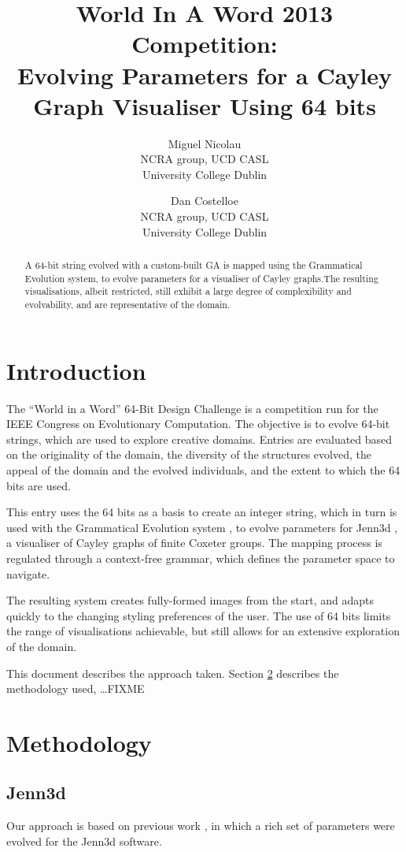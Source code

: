 \documentclass{article}
\title{World In A Word 2013 Competition:\\
Evolving Parameters for a Cayley Graph Visualiser Using 64 bits}
\author{Miguel Nicolau\\
NCRA group, UCD CASL\\
University College Dublin
\and Dan Costelloe\\
NCRA group, UCD CASL\\
University College Dublin}
\date{}
\begin{document}
\maketitle
\begin{abstract}
A 64-bit string evolved with a custom-built GA is mapped using the Grammatical
Evolution system, to evolve parameters for a visualiser of Cayley graphs.The
resulting visualisations, albeit restricted, still exhibit a large degree of
complexibility and evolvability, and are representative of the domain.
\end{abstract}

\section{Introduction}
The ``World in a Word'' 64-Bit Design Challenge is a competition run for the
IEEE Congress on Evolutionary Computation. The objective is to evolve 64-bit
strings, which are used to explore creative domains. Entries are evaluated
based on the originality of the domain, the diversity of the structures
evolved, the appeal of the domain and the evolved individuals, and the extent
to which the 64 bits are used.

This entry uses the 64 bits as a basis to create an integer string, which in
turn is used with the Grammatical Evolution system \cite{oneill03b}, to
evolve parameters for Jenn3d \cite{obermeyer10a}, a visualiser of Cayley graphs of
finite Coxeter groups. The mapping process is regulated through a context-free
grammar, which defines the parameter space to navigate.

The resulting system creates fully-formed images from the start, and adapts
quickly to the changing styling preferences of the user. The use of 64 bits
limits the range of visualisations achievable, but still allows for an
extensive exploration of the domain.

This document describes the approach taken. Section \ref{methodology} describes
the methodology used, \ldots FIXME

\section{Methodology}
\label{methodology}

\subsection{Jenn3d}
Our approach is based on previous work \cite{nicolau2011a}, in which a rich set
of parameters were evolved for the Jenn3d software.
\end{document}
